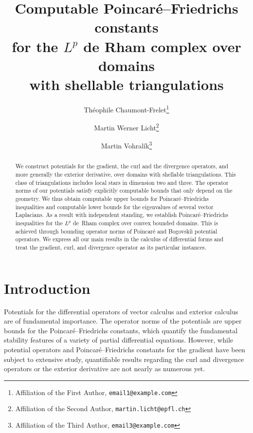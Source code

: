 \documentclass[10pt,letterpaper]{article}
\title{Computable Poincar\'e--Friedrichs constants\\ for the $L^{p}$ de Rham complex over domains\\ with shellable triangulations}
\author{
    Th\'eophile Chaumont-Frelet\thanks{Affiliation of the First Author, \texttt{email1@example.com}} \and
    Martin Werner Licht\thanks{Affiliation of the Second Author, \texttt{martin.licht@epfl.ch}} \and
    Martin Vohral\'ik\thanks{Affiliation of the Third Author, \texttt{email3@example.com}}
}
\begin{document}
\maketitle

\begin{abstract}
    We construct potentials for the gradient, the curl and the divergence operators, and more generally the exterior derivative, over domains with shellable triangulations. This class of triangulations includes local stars in dimension two and three. 
    The operator norms of our potentials satisfy explicitly computable bounds that only depend on the geometry. 
    We thus obtain computable upper bounds for Poincar\'e--Friedrichs inequalities and computable lower bounds for the eigenvalues of several vector Laplacians. 
    As a result with independent standing, we establish Poincar\'e--Friedrichs inequalities for the $L^{p}$ de~Rham complex over convex bounded domains. 
    This is achieved through bounding operator norms of Poincar\'e and Bogovski\u{\i} potential operators.
    We express all our main results in the calculus of differential forms and treat the gradient, curl, and divergence operator as its particular instances. 
\end{abstract}


\section{Introduction}\label{section:intro}

Potentials for the differential operators of vector calculus and exterior calculus are of fundamental importance.
The operator norms of the potentials are upper bounds for the Poincar\'e--Friedrichs constants, 
which quantify the fundamental stability features of a variety of partial differential equations.
However, while potential operators and Poincar\'e--Friedrichs constants for the gradient have been subject to extensive study, quantifiable results regarding the curl and divergence operators or the exterior derivative are not nearly as numerous yet. 
\end{document}

